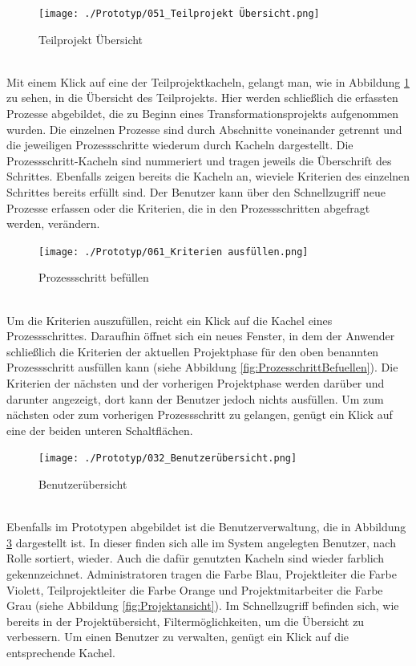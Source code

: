 \begin{figure}[h!]
    \centering
    \texttt{[image: ./Prototyp/051\_Teilprojekt Übersicht.png]}
    \caption[Prototyp: Teilprojekt Übersicht]{Teilprojekt Übersicht}
    \label{fig:TeilprojektÜbersicht}
\end{figure}
\\Mit einem Klick auf eine der Teilprojektkacheln, gelangt man, wie in Abbildung \ref{fig:TeilprojektÜbersicht} zu sehen, in die Übersicht des Teilprojekts. Hier werden schließlich die erfassten Prozesse abgebildet, die zu Beginn eines Transformationsprojekts aufgenommen wurden. Die einzelnen Prozesse sind durch Abschnitte voneinander getrennt und die jeweiligen Prozessschritte wiederum durch Kacheln dargestellt. Die Prozessschritt-Kacheln sind nummeriert und tragen jeweils die Überschrift des Schrittes. Ebenfalls zeigen bereits die Kacheln an, wieviele Kriterien des einzelnen Schrittes bereits erfüllt sind. Der Benutzer kann über den Schnellzugriff neue Prozesse erfassen oder die Kriterien, die in den Prozessschritten abgefragt werden, verändern.
\begin{figure}[h!]
    \centering
    \texttt{[image: ./Prototyp/061\_Kriterien ausfüllen.png]}
    \caption[Prototyp: Prozessschritt befüllen]{Prozessschritt befüllen}
    \label{fig:ProzessschrittBefuellen}
\end{figure}
\\Um die Kriterien auszufüllen, reicht ein Klick auf die Kachel eines Prozessschrittes. Daraufhin öffnet sich ein neues Fenster, in dem der Anwender schließlich die Kriterien der aktuellen Projektphase für den oben benannten Prozessschritt ausfüllen kann (siehe Abbildung \ref{fig:ProzesschrittBefuellen}). Die Kriterien der nächsten und der vorherigen Projektphase werden darüber und darunter angezeigt, dort kann der Benutzer jedoch nichts ausfüllen. Um zum nächsten oder zum vorherigen Prozessschritt zu gelangen, genügt ein Klick auf eine der beiden unteren Schaltflächen.
\begin{figure}[h!]
    \centering
    \texttt{[image: ./Prototyp/032\_Benutzerübersicht.png]}
    \caption[Prototyp: Benutzerübersicht]{Benutzerübersicht}
    \label{fig:Benutzeruebersicht}
\end{figure}
\\Ebenfalls im Prototypen abgebildet ist die Benutzerverwaltung, die in Abbildung \ref{fig:Benutzeruebersicht} dargestellt ist. In dieser finden sich alle im System angelegten Benutzer, nach Rolle sortiert, wieder. Auch die dafür genutzten Kacheln sind wieder farblich gekennzeichnet. Administratoren tragen die Farbe Blau, Projektleiter die Farbe Violett, Teilprojektleiter die Farbe Orange und Projektmitarbeiter die Farbe Grau (siehe Abbildung \ref{fig:Projektansicht}). Im Schnellzugriff befinden sich, wie bereits in der Projektübersicht, Filtermöglichkeiten, um die Übersicht zu verbessern. Um einen Benutzer zu verwalten, genügt ein Klick auf die entsprechende Kachel.
